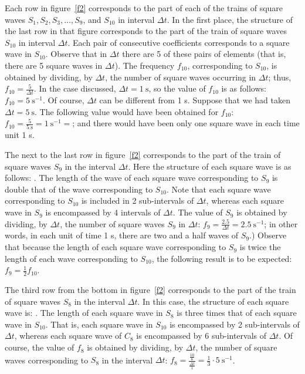 \documentclass[11pt]{rMTA2010} \usepackage[utf8]{inputenc} \usepackage{graphicx} \usepackage{booktabs} \usepackage{array} \usepackage{enumerate}
\begin{document}
Each row in figure~\ref{f2} corresponds to the part of each of the trains of square waves $S_1, S_2, S_3, \dots, S_9$, and $S_{10}$ in interval $\Delta t$. In the first place, the structure of the last row in that figure corresponds to the part of the train of square waves $S_{10}$ in interval $\Delta t$. Each pair of consecutive coefficients  corresponds to a square wave in $S_{10}$. Observe that in $\Delta t$ there are 5 of these pairs of elements (that is, there are 5 square waves in $\Delta t$). The frequency $f_{10}$, corresponding to $S_{10}$, is obtained by dividing, by $\Delta t$, the number of square waves occurring in $\Delta t$; thus, $f_{10} =\tfrac{5}{\Delta t}$. In the case discussed, $\Delta t = 1 \:\mathrm{s}$, so the value of $f_{10}$ is as follows: $f_{10} = 5\:\mathrm{s}^{-1}$. Of course, $\Delta t$ can be different from 1 s.  Suppose that we had taken $\Delta t=5\:\mathrm{s}$. The following value would have been obtained for $f_{10}$: $f_{10}=\tfrac{5}{5\:\mathrm{s}}=1\:\mathrm{s}^{-1}=$; and there would have been only one square wave in each time unit 1 s.

The next to the last row in figure~\ref{f2} corresponds to the part of the train of square waves $S_{9}$ in the interval $\Delta t$. Here the structure of each square wave is as follows: . The length of the wave of each square wave corresponding to $S_{9}$ is double that of the wave corresponding to $S_{10}$. Note that each square wave corresponding to $S_{10}$ is included in 2 sub-intervals of $\Delta t$, whereas each square wave in $S_{9}$ is encompassed by 4 intervals of $\Delta t$. The value of $S_{9}$ is obtained by dividing, by $\Delta t$, the number of square waves $S_{9}$ in $\Delta t$: $f_9=\tfrac{2.5}{\Delta t}=2.5\:\mathrm{s}^{-1}$; in other words, in each unit of time 1 s, there are two and a half waves of $S_{9}$.) Observe that because the length of each square wave corresponding to $S_{9}$ is twice the length of each wave corresponding to $S_{10}$, the following result is to be expected: $f_9=\tfrac{1}{2}f_{10}$.


The third row from the bottom in figure~\ref{f2} corresponds to the part of the train of square waves $S_{8}$ in the interval $\Delta t$. In this case, the structure of each square wave is: . The length of each square wave in $S_{8}$ is three times that of each square wave in $S_{10}$. That is, each square wave in $S_{10}$ is encompassed by 2 sub-intervals of $\Delta t$, whereas each square wave of $C_{8}$ is encompassed by 6 sub-intervals of $\Delta t$. Of course, the value of $f_{8}$ is obtained by dividing, by $\Delta t$, the number of square waves corresponding to $S_{8}$ in the interval $\Delta t$: $f_8=\frac{\scriptscriptstyle \tfrac{10}{6}}{\tfrac{\Delta t}{1}}=\tfrac{1}{3}\cdot5\:\mathrm{s}^{-1}$.
\end{document}
